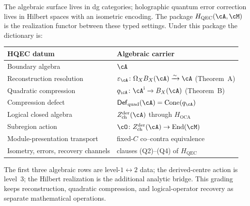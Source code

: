 \begin{remark}
\label{rem:thqg-hqec-analogy}
The algebraic surface lives in dg categories; holographic quantum
error correction lives in Hilbert spaces with an isometric encoding.
The package $H_{\mathrm{QEC}}(\cA,\cM)$ is the realization functor
between these typed settings.  Under this package the dictionary is:
\begin{center}
\renewcommand{\arraystretch}{1.2}
\small
\begin{tabular}{@{}p{}p{}@{}}
\textbf{HQEC datum} & \textbf{Algebraic carrier} \\
\midrule
Boundary algebra & $\cA$ \\
Reconstruction resolution &
 $\varepsilon_\cA\colon\Omega_XB_X(\cA)\xrightarrow{\sim}\cA$
 \textup{(}Theorem~A\textup{)} \\
Quadratic compression &
 $q_\cA\colon\cA^{\mathrm i}\to B_X(\cA)$
 \textup{(}Theorem~B\textup{)} \\
Compression defect &
 $\mathsf{Def}_{\mathrm{quad}}(\cA)=\operatorname{Cone}(q_\cA)$ \\
Logical closed algebra & $Z^{\mathrm{der}}_{\mathrm{ch}}(\cA)$
 through $H_{\mathrm{OCA}}$ \\
Subregion action &
 $\cO\colon Z^{\mathrm{der}}_{\mathrm{ch}}(\cA)
 \to\operatorname{End}(\cM)$ \\
Module-presentation transport & fixed-$C$ co--contra equivalence \\
Isometry, errors, recovery channels & clauses \textup{(Q2)--(Q4)} of
 $H_{\mathrm{QEC}}$
\end{tabular}
\end{center}
The first three algebraic rows are level-$1\leftrightarrow2$ data;
the derived-centre action is level~$3$; the Hilbert realization is the
additional analytic bridge.  This grading keeps reconstruction,
quadratic compression, and logical-operator recovery as separate
mathematical operations.
\end{remark}

